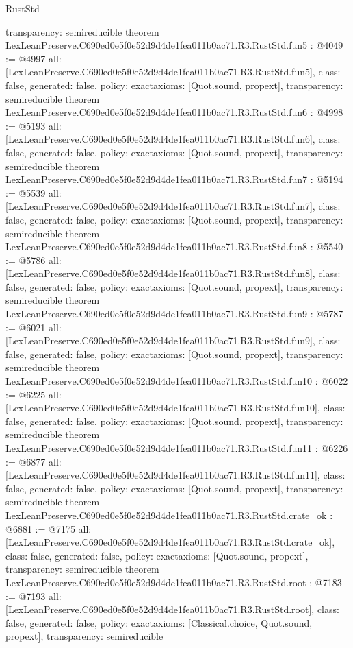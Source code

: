 \begin{lexlean}{RustStd}
\begin{coremodule}
{  transparency: semireducible
}
theorem LexLeanPreserve.C690ed0e5f0e52d9d4de1fea011b0ac71.R3.RustStd.fun5 : @4049 := @4997 {
  all: [LexLeanPreserve.C690ed0e5f0e52d9d4de1fea011b0ac71.R3.RustStd.fun5],
  class: false,
  generated: false,
  policy: exact{axioms: [Quot.sound, propext]},
  transparency: semireducible
}
theorem LexLeanPreserve.C690ed0e5f0e52d9d4de1fea011b0ac71.R3.RustStd.fun6 : @4998 := @5193 {
  all: [LexLeanPreserve.C690ed0e5f0e52d9d4de1fea011b0ac71.R3.RustStd.fun6],
  class: false,
  generated: false,
  policy: exact{axioms: [Quot.sound, propext]},
  transparency: semireducible
}
theorem LexLeanPreserve.C690ed0e5f0e52d9d4de1fea011b0ac71.R3.RustStd.fun7 : @5194 := @5539 {
  all: [LexLeanPreserve.C690ed0e5f0e52d9d4de1fea011b0ac71.R3.RustStd.fun7],
  class: false,
  generated: false,
  policy: exact{axioms: [Quot.sound, propext]},
  transparency: semireducible
}
theorem LexLeanPreserve.C690ed0e5f0e52d9d4de1fea011b0ac71.R3.RustStd.fun8 : @5540 := @5786 {
  all: [LexLeanPreserve.C690ed0e5f0e52d9d4de1fea011b0ac71.R3.RustStd.fun8],
  class: false,
  generated: false,
  policy: exact{axioms: [Quot.sound, propext]},
  transparency: semireducible
}
theorem LexLeanPreserve.C690ed0e5f0e52d9d4de1fea011b0ac71.R3.RustStd.fun9 : @5787 := @6021 {
  all: [LexLeanPreserve.C690ed0e5f0e52d9d4de1fea011b0ac71.R3.RustStd.fun9],
  class: false,
  generated: false,
  policy: exact{axioms: [Quot.sound, propext]},
  transparency: semireducible
}
theorem LexLeanPreserve.C690ed0e5f0e52d9d4de1fea011b0ac71.R3.RustStd.fun10 : @6022 := @6225 {
  all: [LexLeanPreserve.C690ed0e5f0e52d9d4de1fea011b0ac71.R3.RustStd.fun10],
  class: false,
  generated: false,
  policy: exact{axioms: [Quot.sound, propext]},
  transparency: semireducible
}
theorem LexLeanPreserve.C690ed0e5f0e52d9d4de1fea011b0ac71.R3.RustStd.fun11 : @6226 := @6877 {
  all: [LexLeanPreserve.C690ed0e5f0e52d9d4de1fea011b0ac71.R3.RustStd.fun11],
  class: false,
  generated: false,
  policy: exact{axioms: [Quot.sound, propext]},
  transparency: semireducible
}
theorem LexLeanPreserve.C690ed0e5f0e52d9d4de1fea011b0ac71.R3.RustStd.crate_ok : @6881 := @7175 {
  all: [LexLeanPreserve.C690ed0e5f0e52d9d4de1fea011b0ac71.R3.RustStd.crate_ok],
  class: false,
  generated: false,
  policy: exact{axioms: [Quot.sound, propext]},
  transparency: semireducible
}
theorem LexLeanPreserve.C690ed0e5f0e52d9d4de1fea011b0ac71.R3.RustStd.root : @7183 := @7193 {
  all: [LexLeanPreserve.C690ed0e5f0e52d9d4de1fea011b0ac71.R3.RustStd.root],
  class: false,
  generated: false,
  policy: exact{axioms: [Classical.choice, Quot.sound, propext]},
  transparency: semireducible
}


\end{coremodule}
\end{lexlean}
